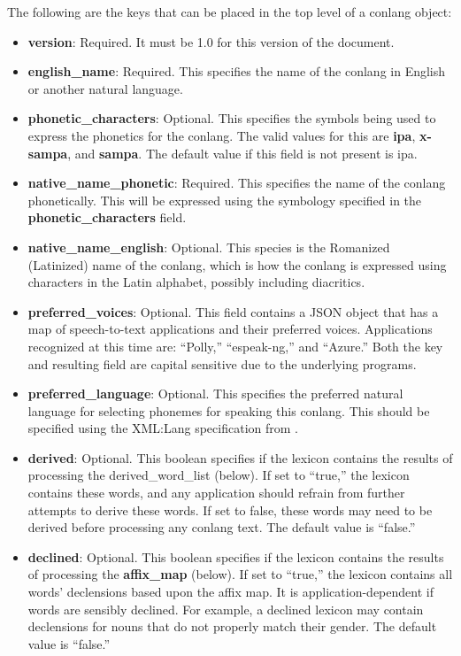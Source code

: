 The following are the keys that can be placed in the top level of a conlang object:
\begin{itemize}
	\item \textbf{version}: Required.  It must be 1.0 for this version of the document.
	\item \textbf{english\_name}: Required.  This specifies the name of the conlang in English or another natural language.
	\item \textbf{phonetic\_characters}: Optional.  This specifies the symbols being used to express the phonetics for the conlang.  The valid values for this are \textbf{ipa}, \textbf{x-sampa}, and \textbf{sampa}.  The default value if this field is not present is ipa.
	\item \textbf{native\_name\_phonetic}: Required. This specifies the name of the conlang phonetically.  This will be expressed using the symbology specified in the \textbf{phonetic\_characters} field.
	\item \textbf{native\_name\_english}: Optional.  This species is the Romanized (Latinized) name of the conlang, which is how the conlang is expressed using characters in the Latin alphabet, possibly including diacritics.
	\item \textbf{preferred\_voices}: Optional.  This field contains a JSON object that has a map of speech-to-text applications and their preferred voices.  Applications recognized at this time are: ``Polly,'' ``espeak-ng,'' and ``Azure.''  Both the key and resulting field are capital sensitive due to the underlying programs.
	\item \textbf{preferred\_language}: Optional.  This specifies the preferred natural language for selecting phonemes for speaking this conlang.  This should be specified using the XML:Lang specification from \cite{froumentinW3CSpeechInterface2005}.
	\item \textbf{derived}: Optional. This boolean specifies if the lexicon contains the results of processing the derived\_word\_list (below).  If set to ``true,'' the lexicon contains these words, and any application should refrain from further attempts to derive these words.  If set to false, these words may need to be derived before processing any conlang text.  The default value is ``false.''
	\item \textbf{declined}: Optional. This boolean specifies if the lexicon contains the results of processing the \textbf{affix\_map} (below). If set to ``true,'' the lexicon contains all words' declensions based upon the affix map.  It is application-dependent if words are sensibly declined.  For example, a declined lexicon may contain declensions for nouns that do not properly match their gender.  The default value is ``false.''

\end{itemize}
